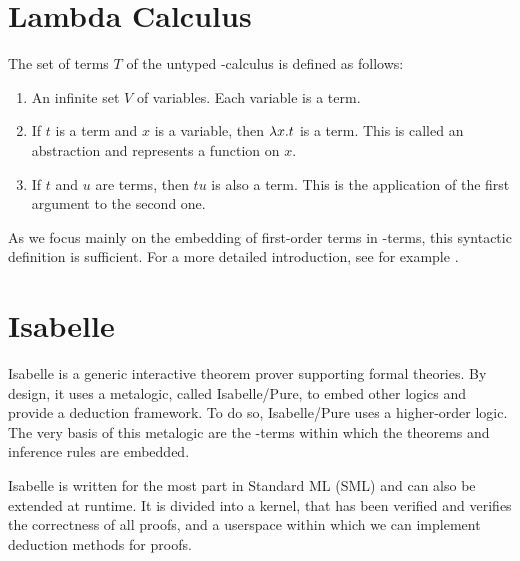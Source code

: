 \section{Lambda Calculus}
The set of terms $T$ of the untyped \lam -calculus is defined as follows:
\begin{enumerate}
  \item An infinite set $V$ of variables. Each variable is a term.
  \item If $t$ is a term and $x$ is a variable, then $\lambda x. t$ is a term. This is called an abstraction and represents a function on $x$.
  \item If $t$ and $u$ are terms, then $t u$ is also a term. This is the application of the first argument to the second one.
\end{enumerate}
As we focus mainly on the embedding of first-order terms in \lam -terms, this syntactic definition is sufficient. For a more detailed introduction, see for example \cite{loader_notes_nodate}.

\section{Isabelle}
Isabelle is a generic interactive theorem prover supporting formal theories. By design, it uses a metalogic, called Isabelle/Pure, to embed other logics and provide a deduction framework. To do so, Isabelle/Pure uses a higher-order logic. The very basis of this metalogic are the \lam -terms within which the theorems and inference rules are embedded.

Isabelle is written for the most part in Standard ML (SML) and can also be extended at runtime. It is divided into a kernel, that has been verified and verifies the correctness of all proofs, and a userspace within which we can implement deduction methods for proofs.

